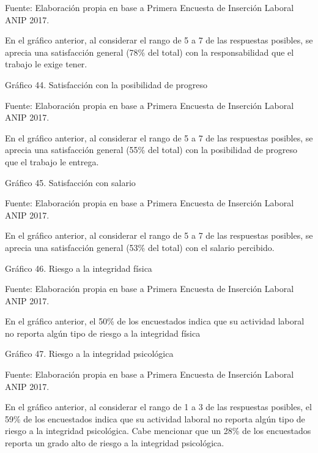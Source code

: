\documentclass{article}
\begin{document}

Fuente: Elaboración propia en base a Primera Encuesta de Inserción Laboral ANIP 2017.

En el gráfico anterior, al considerar el rango de 5 a 7 de las respuestas posibles, se aprecia una satisfacción general (78\% del total) con la responsabilidad que el trabajo le exige tener.

Gráfico 44. Satisfacción con la posibilidad de progreso


Fuente: Elaboración propia en base a Primera Encuesta de Inserción Laboral ANIP 2017.

En el gráfico anterior, al considerar el rango de 5 a 7 de las respuestas posibles, se aprecia una satisfacción general (55\% del total) con la posibilidad de progreso que el trabajo le entrega.

Gráfico 45. Satisfacción con salario


Fuente: Elaboración propia en base a Primera Encuesta de Inserción Laboral ANIP 2017.

En el gráfico anterior, al considerar el rango de 5 a 7 de las respuestas posibles, se aprecia una satisfacción general (53\% del total) con el salario percibido.

Gráfico 46. Riesgo a la integridad física


Fuente: Elaboración propia en base a Primera Encuesta de Inserción Laboral ANIP 2017.

En el gráfico anterior, el 50\% de los encuestados indica que su actividad laboral no reporta algún tipo de riesgo a la integridad física

Gráfico 47. Riesgo a la integridad psicológica


Fuente: Elaboración propia en base a Primera Encuesta de Inserción Laboral ANIP 2017.

En el gráfico anterior, al considerar el rango de 1 a 3 de las respuestas posibles, el 59\% de los encuestados indica que su actividad laboral no reporta algún tipo de riesgo a la integridad psicológica. Cabe mencionar que un 28\% de los encuestados reporta un grado alto de riesgo a la integridad psicológica.
\end{document}
